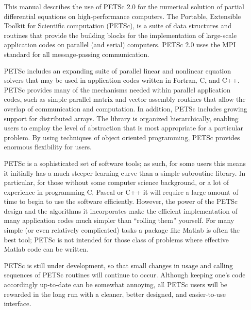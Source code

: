 

\medskip \medskip
This manual describes the use of PETSc 2.0 for the numerical solution
of partial differential equations on high-performance computers.  The
Portable, Extensible Toolkit for Scientific computation (PETSc), is a
suite of data structures and routines that provide the building
blocks for the implementation of large-scale application codes on parallel
(and serial) computers.  PETSc 2.0 uses the MPI standard for all
message-passing communication.

PETSc includes an expanding suite of parallel linear and nonlinear
equation solvers that may be  used in application codes written in
Fortran, C, and C++.  PETSc provides many of the mechanisms needed
within parallel application codes, such as simple parallel matrix and
vector assembly routines that allow the overlap of communication and
computation.  In addition, PETSc includes growing support for
distributed arrays.  The library is organized
hierarchically, enabling users to employ the level of abstraction that
is most appropriate for a particular problem. By using techniques 
of object oriented programming, PETSc provides enormous flexibility 
for users.

PETSc is a sophisticated set of software tools; as such, for some
users this means it initially has a much steeper learning curve than a
simple subroutine library. In particular, for those without some
computer science background, or a lot of experience in programming C,
Pascal or C++ it will require a large amount of time to begin to use
the software efficiently.  However, the power of the PETSc design and
the algorithms it incorporates make the efficient implementation of
many application codes much simpler than ``rolling them'' yourself.
For many simple (or even relatively complicated) tasks a package like
Matlab is often the best tool; PETSc is not intended for those class
of problems where effective Matlab code can be written.

PETSc is still under development, so that small changes in usage and
calling sequences of PETSc routines will continue to occur.  Although
keeping one's code accordingly up-to-date can be somewhat annoying,
all PETSc users will be rewarded in the long run with a cleaner,
better designed, and easier-to-use interface.
